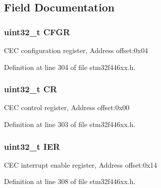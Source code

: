 \subsection{Field Documentation}
\subsubsection[{\texorpdfstring{C\+F\+GR}{CFGR}}]{ uint32\+\_\+t C\+F\+GR}\hypertarget{struct_c_e_c___type_def_a26f1e746ccbf9c9f67e7c60e61085ec1}{}\label{struct_c_e_c___type_def_a26f1e746ccbf9c9f67e7c60e61085ec1}
C\+EC configuration register, Address offset\+:0x04 

Definition at line 304 of file stm32f446xx.\+h.

\subsubsection[{\texorpdfstring{CR}{CR}}]{ uint32\+\_\+t CR}\hypertarget{struct_c_e_c___type_def_ab40c89c59391aaa9d9a8ec011dd0907a}{}\label{struct_c_e_c___type_def_ab40c89c59391aaa9d9a8ec011dd0907a}
C\+EC control register, Address offset\+:0x00 

Definition at line 303 of file stm32f446xx.\+h.

\subsubsection[{\texorpdfstring{I\+ER}{IER}}]{ uint32\+\_\+t I\+ER}\hypertarget{struct_c_e_c___type_def_a6566f8cfbd1d8aa7e8db046aa35e77db}{}\label{struct_c_e_c___type_def_a6566f8cfbd1d8aa7e8db046aa35e77db}
C\+EC interrupt enable register, Address offset\+:0x14 

Definition at line 308 of file stm32f446xx.\+h.


